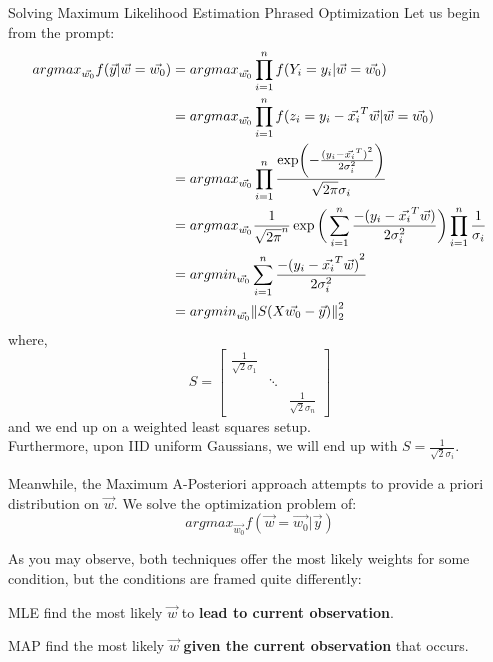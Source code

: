 \begin{ln-explain}{Solving Maximum Likelihood Estimation Phrased Optimization}{}
    Let us begin from the prompt:
    \begin{align*}
        {argmax}_{\vec{w_0}} f (\vec{y} | \vec{w} = \vec{w_0})
        &= {argmax}_{\vec{w_0}} \prod_{i = 1}^n f(Y_i = y_i | \vec{w} = \vec{w_0}) \\
        &= {argmax}_{\vec{w_0}} \prod_{i = 1}^n f(z_i = y_i - \vec{x_i}^T \vec{w} | \vec{w} = \vec{w_0}) \\
        &= {argmax}_{\vec{w_0}} \prod_{i = 1}^n \frac{\exp(-\frac{{(y_i - \vec{x_i}^T)}^2}{2\sigma_i^2})}{\sqrt{2 \pi} \sigma_i} \\
        &= {argmax}_{\vec{w_0}} \frac{1}{{\sqrt{2\pi}}^n} \exp \bigg( \sum_{i = 1}^n \frac{-(y_i - \vec{x_i}^T \vec{w})}{2 \sigma_i^2} \bigg) \prod_{i = 1}^n \frac{1}{\sigma_i} \\
        &= {argmin}_{\vec{w_0}} \sum_{i = 1}^n \frac{-{(y_i - \vec{x_i}^T \vec{w})}^2}{2 \sigma_i^2} \\
        &= {argmin}_{\vec{w_0}} \pnorm[2]{S(X \vec{w_0} - \vec{y})}{2}
    \end{align*}
    where,
    \[
        S =
        \begin{bmatrix}
            \frac{1}{\sqrt{2} \sigma_1} & & \\
            & \ddots & \\
            & & \frac{1}{\sqrt{2} \sigma_n}
        \end{bmatrix}
    \]
    and we end up on a weighted least squares setup. \\
    Furthermore, upon IID uniform Gaussians, we will end up with $S = \frac{1}{\sqrt{2} \sigma_i}$.
\end{ln-explain}

Meanwhile, the Maximum A-Posteriori approach attempts to provide a priori distribution on $\vec{w}$.
We solve the optimization problem of:
\[
    {argmax}_{\vec{w_0}} f(\vec{w} = \vec{w_0} | \vec{y})
\]

As you may observe, both techniques offer the most likely weights for some condition, but the conditions are framed quite differently:
\begin{bindenum}
    \item MLE find the most likely $\vec{w}$ to \textbf{lead to current observation}.
    \item MAP find the most likely $\vec{w}$ \textbf{given the current observation} that occurs.
\end{bindenum}
